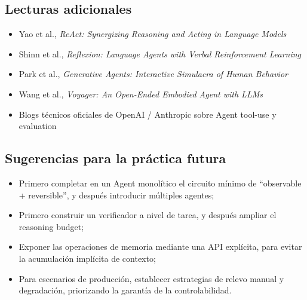 \subsection{Lecturas adicionales}
\begin{itemize}
    \item Yao et al., \textit{ReAct: Synergizing Reasoning and Acting in Language Models}
    \item Shinn et al., \textit{Reflexion: Language Agents with Verbal Reinforcement Learning}
    \item Park et al., \textit{Generative Agents: Interactive Simulacra of Human Behavior}
    \item Wang et al., \textit{Voyager: An Open-Ended Embodied Agent with LLMs}
    \item Blogs técnicos oficiales de OpenAI / Anthropic sobre Agent tool-use y evaluation
\end{itemize}

\subsection{Sugerencias para la práctica futura}
\begin{itemize}
    \item Primero completar en un Agent monolítico el circuito mínimo de ``observable + reversible'', y después introducir múltiples agentes;
    \item Primero construir un verificador a nivel de tarea, y después ampliar el reasoning budget;
    \item Exponer las operaciones de memoria mediante una API explícita, para evitar la acumulación implícita de contexto;
    \item Para escenarios de producción, establecer estrategias de relevo manual y degradación, priorizando la garantía de la controlabilidad.
\end{itemize}



